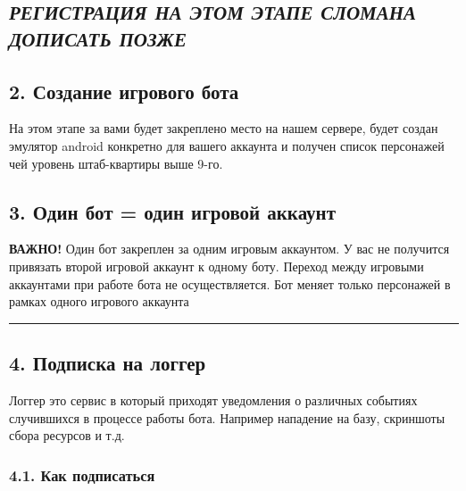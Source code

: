 \documentclass[
]{article}
\begin{document}
\subsection{\texorpdfstring{\textbf{\emph{{РЕГИСТРАЦИЯ НА ЭТОМ ЭТАПЕ
СЛОМАНА ДОПИСАТЬ
ПОЗЖЕ}}}}{РЕГИСТРАЦИЯ НА ЭТОМ ЭТАПЕ СЛОМАНА ДОПИСАТЬ ПОЗЖЕ}}\label{ux440ux435ux433ux438ux441ux442ux440ux430ux446ux438ux44f-ux43dux430-ux44dux442ux43eux43c-ux44dux442ux430ux43fux435-ux441ux43bux43eux43cux430ux43dux430-ux434ux43eux43fux438ux441ux430ux442ux44c-ux43fux43eux437ux436ux435}

\subsection{2. Создание игрового
бота}\label{ux441ux43eux437ux434ux430ux43dux438ux435-ux438ux433ux440ux43eux432ux43eux433ux43e-ux431ux43eux442ux430}

На этом этапе за вами будет закреплено место на нашем сервере, будет
создан эмулятор android конкретно для вашего аккаунта и получен список
персонажей чей уровень штаб-квартиры выше 9-го.

\subsection{3. Один бот = один игровой
аккаунт}\label{ux43eux434ux438ux43d-ux431ux43eux442-ux43eux434ux438ux43d-ux438ux433ux440ux43eux432ux43eux439-ux430ux43aux43aux430ux443ux43dux442}

\textbf{{ВАЖНО!}} Один бот закреплен за одним игровым аккаунтом. У вас
не получится привязать второй игровой аккаунт к одному боту. Переход
между игровыми аккаунтами при работе бота не осуществляется. Бот меняет
только персонажей в рамках одного игрового аккаунта

\begin{center}\rule{0.5\linewidth}{0.5pt}\end{center}

\subsection{4. Подписка на
логгер}\label{ux43fux43eux434ux43fux438ux441ux43aux430-ux43dux430-ux43bux43eux433ux433ux435ux440}

Логгер это сервис в который приходят уведомления о различных событиях
случившихся в процессе работы бота. Например нападение на базу,
скриншоты сбора ресурсов и т.д.

\subsubsection{4.1. Как
подписаться}\label{ux43aux430ux43a-ux43fux43eux434ux43fux438ux441ux430ux442ux44cux441ux44f}
\end{document}
